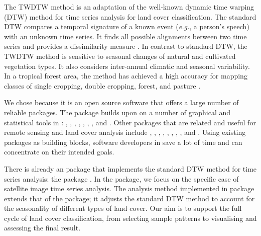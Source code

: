 \documentclass[article,shortnames]{jss}
\begin{document}
The TWDTW method is an adaptation of the well-known dynamic time warping
(DTW) method for time series analysis
\citep{Velichko:1970, Sakoe:1971, Sakoe:1978, Rabiner:1993, Berndt:1994, Keogh:2005, Muller:2007}
for land cover classification. The standard DTW compares a temporal
signature of a known event (\emph{e.g.}, a person's speech) with an
unknown time series. It finds all possible alignments between two time
series and provides a dissimilarity measure \citep{Rabiner:1993}. In
contrast to standard DTW, the TWDTW method is sensitive to seasonal
changes of natural and cultivated vegetation types. It also considers
inter-annual climatic and seasonal variability. In a tropical forest
area, the method has achieved a high accuracy for mapping classes of
single cropping, double cropping, forest, and pasture \citep{Maus:2016}.

We chose  because it is an open source software that offers
a large number of reliable packages. The  package builds
upon on a number of graphical and statistical tools in :
 \citep{Giorgino:2009},  \citep{Meyer:2015},
 \citep{Zeileis:2005}, 
\citep{Wood:2000, Wood:2003, Wood:2004, Wood:2006, Wood:2011}, 
\citep{Pebesma:2005, Bivand:2013},  \citep{Hijmans:2015},
 \citep{Kuhn:2016}, and  \citep{Wickham:2009}.
Other  packages that are related and useful for remote
sensing and land cover analysis include 
\citep{Goslee:2011},  \citep{Bivand:2015}, 
\citep{Pebesma:2012, Bivand:2013}, 
\citep{Verbesselt:2010, Verbesselt:2010a}, 
\citep{Verbesselt:2011},  \citep{Dutrieux:2014},
 \citep{Tuck:2014},  \citep{Bivand:2015},
and  \citep{Moulds:2015}. Using existing packages as building
blocks, software developers in  save a lot of time and can
concentrate on their intended goals.

There is already an  package that implements the standard
DTW method for time series analysis: the  package
\citep{Giorgino:2009}. In the  package, we focus on the
specific case of satellite image time series analysis. The analysis
method implemented in  package extends that of the 
package; it adjusts the standard DTW method to account for the
seasonality of different types of land cover. Our aim is to support the
full cycle of land cover classification, from selecting sample patterns
to visualising and assessing the final result.
\end{document}
